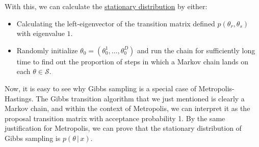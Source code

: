   With this, we can calculate the \hyperref[sp-def:stationary-distribution]{stationary distribution} by either:
  \begin{itemize}
    \item Calculating the left-eigenvector of the transition matrix defined $p(\theta_r, \theta_s)$ with eigenvalue $1$.
    \item Randomly initialize $\theta_0 = (\theta_0^1, \ldots, \theta_0^D)$ and run the chain for sufficiently long time to find out the proportion of steps in which a Markov chain lands on each $\theta \in \mathcal{S}$.
  \end{itemize}

  Now, it is easy to see why Gibbs sampling is a special case of Metropolis-Hastings. The Gibbs transition algorithm that we just mentioned is clearly a Markov chain, and within the context of Metropolis, we can interpret it as the proposal transition matrix with acceptance probability 1. By the same justification for Metropolis, we can prove that the stationary distribution of Gibbs sampling is $p(\theta\,|\,x)$.

